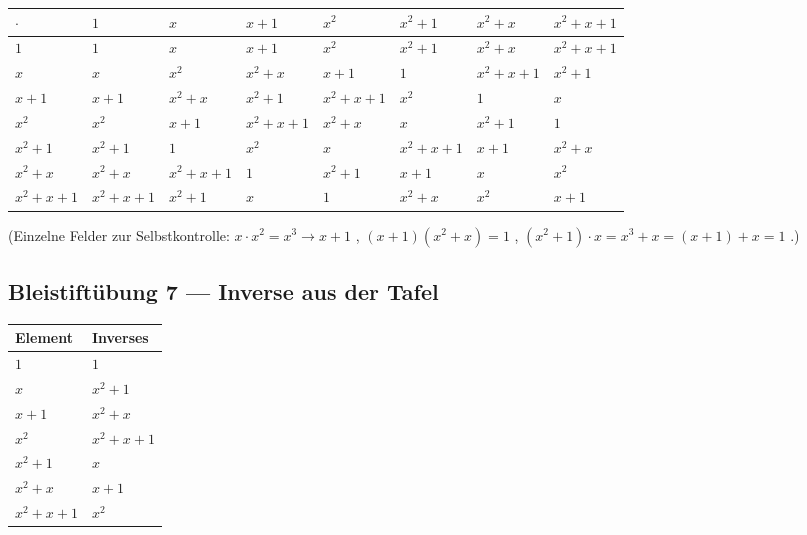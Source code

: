 \begin{center}\small
\begin{tabular}{l|lllllll}
  \toprule
  $\cdot$       & $1$    & $x$    & $x{+}1$ & $x^2$    & $x^2{+}1$ & $x^2{+}x$ & $x^2{+}x{+}1$ \\
  \midrule
  $1$           & $1$    & $x$    & $x{+}1$ & $x^2$    & $x^2{+}1$ & $x^2{+}x$ & $x^2{+}x{+}1$ \\
  $x$           & $x$    & $x^2$  & $x^2{+}x$ & $x{+}1$ & $1$       & $x^2{+}x{+}1$ & $x^2{+}1$ \\
  $x{+}1$       & $x{+}1$ & $x^2{+}x$ & $x^2{+}1$ & $x^2{+}x{+}1$ & $x^2$ & $1$ & $x$ \\
  $x^2$         & $x^2$  & $x{+}1$ & $x^2{+}x{+}1$ & $x^2{+}x$ & $x$    & $x^2{+}1$ & $1$ \\
  $x^2{+}1$     & $x^2{+}1$ & $1$ & $x^2$ & $x$ & $x^2{+}x{+}1$ & $x{+}1$ & $x^2{+}x$ \\
  $x^2{+}x$     & $x^2{+}x$ & $x^2{+}x{+}1$ & $1$ & $x^2{+}1$ & $x{+}1$ & $x$ & $x^2$ \\
  $x^2{+}x{+}1$ & $x^2{+}x{+}1$ & $x^2{+}1$ & $x$ & $1$ & $x^2{+}x$ & $x^2$ & $x{+}1$ \\
  \bottomrule
\end{tabular}
\end{center}

(Einzelne Felder zur Selbstkontrolle: $x \cdot x^2 = x^3 \to x+1$
\checkmark, $(x+1)(x^2+x) = 1$ \checkmark, $(x^2+1) \cdot x = x^3 + x
= (x+1) + x = 1$ \checkmark.)

\subsection*{Bleistiftübung 7 — Inverse aus der Tafel}

\begin{center}
\begin{tabular}{ll}
  \toprule
  Element & Inverses \\
  \midrule
  $1$       & $1$       \\
  $x$       & $x^2+1$   \\
  $x+1$     & $x^2+x$   \\
  $x^2$     & $x^2+x+1$ \\
  $x^2+1$   & $x$       \\
  $x^2+x$   & $x+1$     \\
  $x^2+x+1$ & $x^2$     \\
  \bottomrule
\end{tabular}
\end{center}

